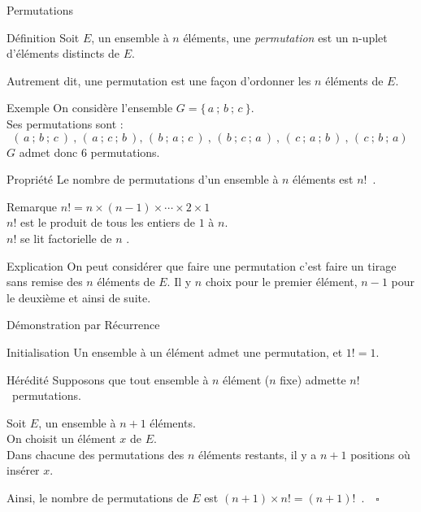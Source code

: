 \documentclass{cours}
\begin{document}
    \begin{Gpartie}{Permutations}
        \begin{Spartie}{Définition}
            Soit $E$, un ensemble à $n$ éléments, une \emph{permutation} est un n-uplet d'éléments distincts de $E$.

            Autrement dit, une permutation est une façon d'ordonner les $n$ éléments de $E$.
            \begin{SSpartie}{Exemple}
                On considère l'ensemble $G=\big\{\,a~;\,b~;\,c~\big\}$. \\ Ses permutations sont :
                \[(\,a~;\,b~;\,c~)~,\,(\,a~;\,c~;\,b~),\,(\,b~;\,a~;\,c~)~,\,(\,b~;\,c~;\,a~)~,\,(\,c~;\,a~;\,b~)~,\,(\,c~;\,b~;\,a)~\]
                $G$ admet donc 6 permutations.
            \end{SSpartie}
        \end{Spartie}
        \begin{Spartie}{Propriété}
            Le nombre de permutations d'un ensemble à $n$ éléments est $n!$~.
            \begin{SSpartie}{Remarque}
                $n! =n\times(n-1)\times\dotsb\times 2\times 1$ \\
                $n!$ est le produit de tous les entiers de $1$ à $n$. \\
                $n!$ se lit \og factorielle de $n$ \fg{}.
            \end{SSpartie}
            \begin{SSpartie}{Explication}
                On peut considérer que faire une permutation c'est faire un tirage sans remise des $n$ éléments de $E$. Il y $n$ choix pour le premier élément, $n-1$ pour le deuxième et ainsi de suite.
            \end{SSpartie}
            \begin{SSpartie}{Démonstration par Récurrence}
                \begin{SSSpartie}{Initialisation}
                    Un ensemble à un élément admet une permutation, et $1! =1$.
                \end{SSSpartie}
                \begin{SSSpartie}{Hérédité}
                    Supposons que tout ensemble à $n$ élément ($n$ fixe) admette $n!$~permutations.

                    Soit $E$, un ensemble à $n+1$ éléments. \\
                    On choisit un élément $x$ de $E$. \\
                    Dans chacune des permutations des $n$ éléments restants, il y a $n+1$ positions où insérer $x$.

                    Ainsi, le nombre de permutations de $E$ est $(n+1)\times n! =(n+1)!$~.$\quad\square$
                \end{SSSpartie}
            \end{SSpartie}
        \end{Spartie}
    \end{Gpartie}
\end{document}
